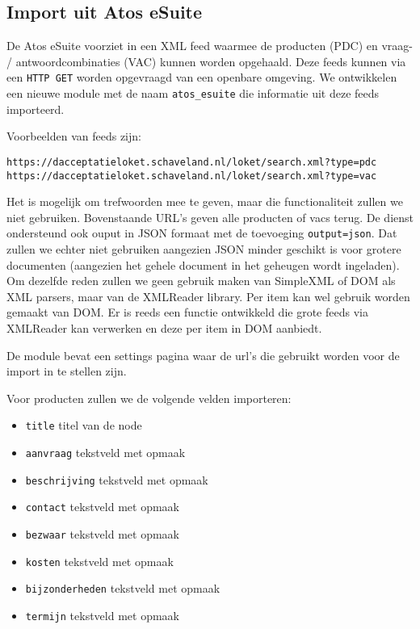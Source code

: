 \subsection{Import uit Atos eSuite}

De Atos eSuite voorziet in een XML feed waarmee de producten (PDC) en vraag- / antwoordcombinaties (VAC) kunnen worden opgehaald. Deze feeds kunnen via een \texttt{HTTP GET} worden opgevraagd van een openbare omgeving.
We ontwikkelen een nieuwe module met de naam \texttt{atos\_esuite} die informatie uit deze feeds importeerd.

Voorbeelden van feeds zijn:
\begin{verbatim}
https://dacceptatieloket.schaveland.nl/loket/search.xml?type=pdc
https://dacceptatieloket.schaveland.nl/loket/search.xml?type=vac
\end{verbatim}
Het is mogelijk om trefwoorden mee te geven, maar die functionaliteit zullen we niet gebruiken. Bovenstaande URL's geven alle producten of vacs terug.
De dienst ondersteund ook ouput in JSON formaat met de toevoeging \texttt{output=json}. Dat zullen we echter niet gebruiken aangezien JSON minder geschikt is voor grotere documenten (aangezien het gehele document in het geheugen wordt ingeladen). Om dezelfde reden zullen we geen gebruik maken van SimpleXML of DOM als XML parsers, maar van de XMLReader library. Per item kan wel gebruik worden gemaakt van DOM. Er is reeds een functie ontwikkeld die grote feeds via XMLReader kan verwerken en deze per item in DOM aanbiedt.

De module bevat een settings pagina waar de url's die gebruikt worden voor de import in te stellen zijn.

Voor producten zullen we de volgende velden importeren:
\begin{itemize}
\item \texttt{title} titel van de node
\item \texttt{aanvraag} tekstveld met opmaak
\item \texttt{beschrijving} tekstveld met opmaak
\item \texttt{contact} tekstveld met opmaak
\item \texttt{bezwaar} tekstveld met opmaak
\item \texttt{kosten} tekstveld met opmaak
\item \texttt{bijzonderheden} tekstveld met opmaak
\item \texttt{termijn} tekstveld met opmaak
\end{itemize}

